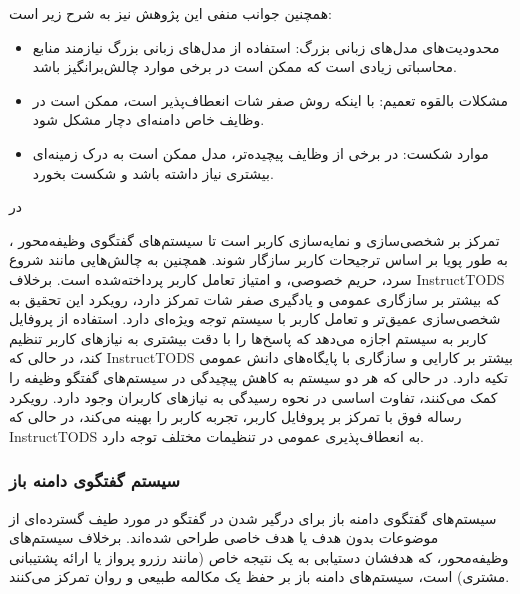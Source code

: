 همچنین جوانب منفی این پژوهش نیز به شرح زیر است:
\begin{itemize}
\item
محدودیت‌های مدل‌های زبانی بزرگ: استفاده از مدل‌های زبانی بزرگ نیازمند منابع محاسباتی زیادی است که ممکن است در برخی موارد چالش‌برانگیز باشد.
\item
مشکلات بالقوه تعمیم: با اینکه روش صفر شات انعطاف‌پذیر است، ممکن است در وظایف خاص دامنه‌ای دچار مشکل شود.
\item
موارد شکست: در برخی از وظایف پیچیده‌تر، مدل ممکن است به درک زمینه‌ای بیشتری نیاز داشته باشد و شکست بخورد.
\end{itemize}

در %
\cite{madotto2021few}

، تمرکز بر شخصی‌سازی و نمایه‌سازی کاربر است تا سیستم‌های گفتگوی وظیفه‌محور به طور پویا بر اساس ترجیحات کاربر سازگار شوند. همچنین به چالش‌هایی مانند شروع سرد، حریم خصوصی، و امتیاز تعامل کاربر پرداخته‌‌شده است. برخلاف InstructTODS که بیشتر بر سازگاری عمومی و یادگیری صفر شات تمرکز دارد، رویکرد این تحقیق به شخصی‌سازی عمیق‌تر و تعامل کاربر با سیستم توجه ویژه‌ای دارد. استفاده از پروفایل کاربر به سیستم اجازه می‌دهد که پاسخ‌ها را با دقت بیشتری به نیازهای کاربر تنظیم کند، در حالی که InstructTODS بیشتر بر کارایی و سازگاری با پایگاه‌های دانش عمومی تکیه دارد. در حالی که هر دو سیستم به کاهش پیچیدگی در سیستم‌های گفتگو وظیفه را کمک می‌کنند، تفاوت اساسی در نحوه رسیدگی به نیازهای کاربران وجود دارد. رویکرد رساله فوق با تمرکز بر پروفایل کاربر، تجربه کاربر را بهینه می‌کند، در حالی که InstructTODS به انعطاف‌پذیری عمومی در تنظیمات مختلف توجه دارد.

\subsubsection{سیستم گفتگوی دامنه باز}
سیستم‌های گفتگوی دامنه باز برای درگیر شدن در گفتگو در مورد طیف گسترده‌ای از موضوعات بدون هدف یا هدف خاصی طراحی شده‌اند. برخلاف سیستم‌های وظیفه‌محور، که هدفشان دستیابی به یک نتیجه خاص (مانند رزرو پرواز یا ارائه پشتیبانی مشتری) است، سیستم‌های دامنه باز بر حفظ یک مکالمه طبیعی و روان تمرکز می‌کنند.


